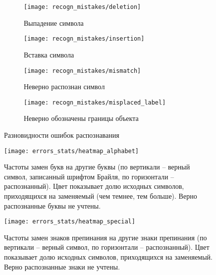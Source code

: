 \documentclass{main.tex}[subfiles]
\begin{document}
\begin{figure}[H]
    \centering
    \begin{subfigure}{.5\textwidth}
        \centering
        \texttt{[image: recogn\_mistakes/deletion]}
        \caption{Выпадение символа}
        \label{fig:recogn_mistakes:del}
    \end{subfigure}%
    \begin{subfigure}{.5\textwidth}
        \centering
        \texttt{[image: recogn\_mistakes/insertion]}
        \caption{Вставка символа}
        \label{fig:recogn_mistakes:ins}
    \end{subfigure}

    \begin{subfigure}{.5\textwidth}
        \centering
        \texttt{[image: recogn\_mistakes/mismatch]}
        \caption{Неверно распознан символ}
        \label{fig:recogn_mistakes:mismatch}
    \end{subfigure}%
    \begin{subfigure}{.5\textwidth}
        \centering
        \texttt{[image: recogn\_mistakes/misplaced\_label]}
        \caption{Неверно обозначены границы объекта}
        \label{fig:recogn_mistakes:misplaced_label}
    \end{subfigure}
    \caption{Разновидности ошибок распознавания}
    \label{fig:recogn_mistakes}
\end{figure}

\begin{figure}[H]
    \centering
    \texttt{[image: errors\_stats/heatmap\_alphabet]}
    \caption{Частоты замен букв на другие буквы (по вертикали -- верный символ, записанный шрифтом Брайля, по горизонтали -- распознанный). Цвет показывает долю исходных символов, приходящихся на заменяемый (чем темнее, тем больше). Верно распознанные буквы не учтены.}
    \label{fig:heatmap_alphabet}
\end{figure}


\begin{figure}[H]
    \centering
    \texttt{[image: errors\_stats/heatmap\_special]}
    \caption{Частоты замен знаков препинания на другие знаки препинания (по вертикали -- верный символ, по горизонтали -- распознанный). Цвет показывает долю исходных символов, приходящихся на заменяемый. Верно распознанные знаки не учтены.}
    \label{fig:heatmap_special}
\end{figure}
\end{document}

